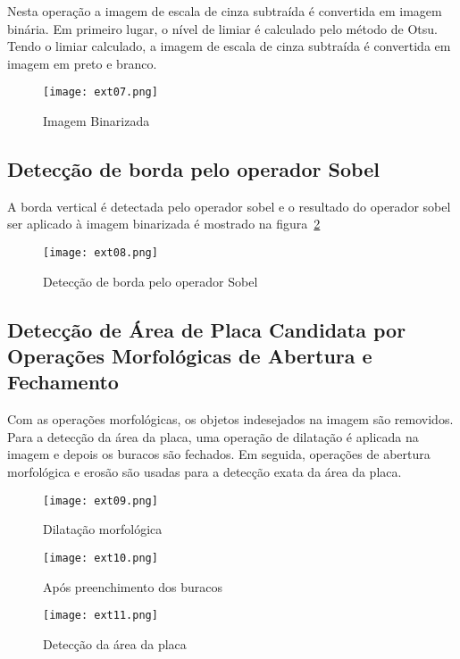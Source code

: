 Nesta operação a imagem de escala de cinza subtraída é convertida em imagem
binária. Em primeiro lugar, o nível de limiar é calculado pelo método de Otsu.
Tendo o limiar calculado, a imagem de escala de cinza subtraída é convertida em
imagem em preto e branco.

\begin{figure}[H]
	\centering
	\texttt{[image: ext07.png]}
	\caption{Imagem Binarizada}
	\label{fig:ext_binarized_image}
\end{figure}

\subsection{Detecção de borda pelo operador Sobel}

A borda vertical é detectada pelo operador sobel e o resultado do operador sobel
ser aplicado à imagem binarizada é mostrado na figura~\ref{fig:ext_edge_detection_sobel}

\begin{figure}[H]
	\centering
	\texttt{[image: ext08.png]}
	\caption{Detecção de borda pelo operador Sobel}
	\label{fig:ext_edge_detection_sobel}
\end{figure}

\subsection{Detecção de Área de Placa Candidata por Operações Morfológicas de Abertura e Fechamento}

Com as operações morfológicas, os objetos indesejados na imagem são removidos.
Para a detecção da área da placa, uma operação de dilatação é aplicada na imagem
e depois os buracos são fechados. Em seguida, operações de abertura morfológica
e erosão são usadas para a detecção exata da área da placa.

\begin{figure}[H]
	\centering
	\texttt{[image: ext09.png]}
	\caption{Dilatação morfológica}
	\label{fig:ext_morphological_dilation}
\end{figure}

\begin{figure}[H]
	\centering
	\texttt{[image: ext10.png]}
	\caption{Após preenchimento dos buracos}
	\label{fig:ext_holes_filled}
\end{figure}

\begin{figure}[H]
	\centering
	\texttt{[image: ext11.png]}
	\caption{Detecção da área da placa}
	\label{fig:ext_plate_area_detection}
\end{figure}

